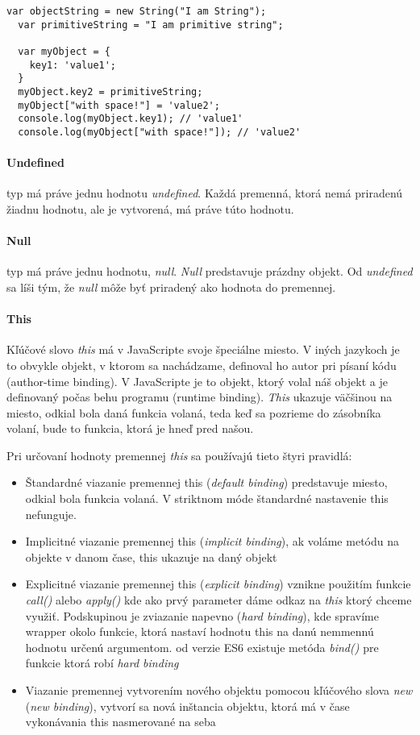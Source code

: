 \begin{lstlisting}[caption=tvorba objektu, label={lst:objekty}]
  var objectString = new String("I am String");
  var primitiveString = "I am primitive string";

  var myObject = {
    key1: 'value1';
  }
  myObject.key2 = primitiveString;
  myObject["with space!"] = 'value2';
  console.log(myObject.key1); // 'value1'
  console.log(myObject["with space!"]); // 'value2'
\end{lstlisting}

\paragraph{Undefined} typ má práve jednu hodnotu \emph{undefined}. Každá premenná, ktorá nemá priradenú žiadnu hodnotu, ale je vytvorená, má práve túto hodnotu.

\paragraph{Null} typ má práve jednu hodnotu, \emph{null}. \emph{Null} predstavuje prázdny objekt. Od \emph{undefined} sa líši tým, že \emph{null} môže byť priradený ako hodnota do premennej.

\paragraph{This}%
Kľúčové slovo \emph{this} má v JavaScripte svoje špeciálne miesto. V iných jazykoch je to obvykle objekt, v ktorom sa nachádzame, definoval ho autor pri písaní kódu (author-time binding). V JavaScripte je to objekt, ktorý volal náš objekt a je definovaný počas behu programu (runtime binding). \emph{This} ukazuje väčšinou na miesto, odkial bola daná funkcia volaná, teda keď sa pozrieme do zásobníka volaní, bude to funkcia, ktorá je hneď pred našou.

Pri určovaní hodnoty premennej \emph{this} sa používajú tieto štyri pravidlá:
\begin{itemize}
  \item Štandardné viazanie premennej this (\emph{default binding}) predstavuje miesto, odkial bola funkcia volaná. V striktnom móde štandardné nastavenie this nefunguje.
  \item Implicitné viazanie premennej this (\emph{implicit binding}), ak voláme metódu na objekte v danom čase, this ukazuje na daný objekt
  \item Explicitné viazanie premennej this (\emph{explicit binding}) vznikne použitím funkcie \emph{call()} alebo \emph{apply()} kde ako prvý parameter dáme odkaz na \emph{this} ktorý chceme využiť. Podskupinou je zviazanie napevno (\emph{hard binding}), kde spravíme wrapper okolo funkcie, ktorá nastaví hodnotu this na danú nemmennú hodnotu určenú argumentom. od verzie ES6 existuje metóda \emph{bind()} pre funkcie ktorá robí \emph{hard binding}
  \item Viazanie premennej vytvorením nového objektu pomocou kľúčového slova \emph{new} (\emph{new binding}), vytvorí sa nová inštancia objektu, ktorá má v čase vykonávania this nasmerované na seba
\end{itemize}

